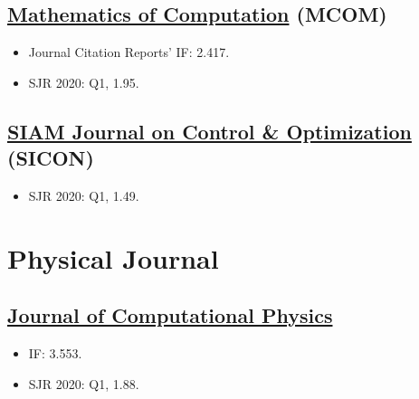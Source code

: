 \documentclass{article}
\numberwithin{equation}{section}
\begin{document}
\subsection{\href{https://www.ams.org/publications/journals/journalsframework/mcom}{Mathematics of Computation} (MCOM)}
\begin{itemize}
	\item Journal Citation Reports' IF: 2.417.
	\item SJR 2020: Q1, 1.95.
\end{itemize}

\subsection{\href{https://www.siam.org/publications/journals/siam-journal-on-control-and-optimization-sicon}{SIAM Journal on Control \& Optimization} (SICON)}
\begin{itemize}
	\item SJR 2020: Q1, 1.49.
\end{itemize}

\section{Physical Journal}

\subsection{\href{https://www.journals.elsevier.com/journal-of-computational-physics}{Journal of Computational Physics}}
\begin{itemize}
	\item IF: 3.553.
	\item SJR 2020: Q1, 1.88.
\end{itemize}


\printbibliography[heading=bibintoc]
\end{document}
